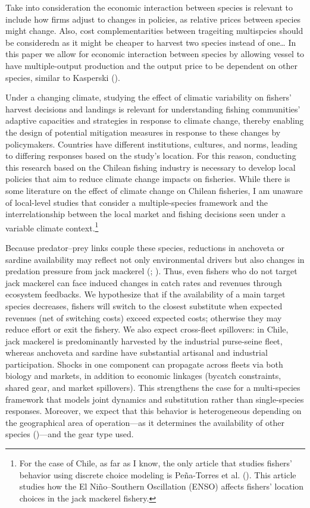 \documentclass[
  11pt,
]{article}
\begin{document}
Take into consideration the economic interaction between species is relevant to include how firms adjust to changes in policies, as relative prices between species might change. Also, cost complementarities between trageiting multispcies should be consideredn as it might be cheaper to harvest two species instead of one\ldots{} In this paper we allow for economic interaction between species by allowing vessel to have multiple-output production and the output price to be dependent on other species, similar to Kasperski ().

Under a changing climate, studying the effect of climatic variability on
fishers' harvest decisions and landings is relevant for understanding
fishing communities' adaptive capacities and strategies in response to
climate change, thereby enabling the design of potential mitigation
measures in response to these changes by policymakers. Countries have
different institutions, cultures, and norms, leading to differing
responses based on the study's location. For this reason, conducting
this research based on the Chilean fishing industry is necessary to
develop local policies that aim to reduce climate change impacts on
fisheries. While there is some literature on the effect of climate
change on Chilean fisheries, I am unaware of local-level studies that
consider a multiple-species framework and the interrelationship between
the local market and fishing decisions seen under a variable climate
context.\footnote{For the case of Chile, as far as I know, the only article that
  studies fishers' behavior using discrete choice modeling is
  Peña-Torres et al. (). This article studies how the El Niño--Southern
  Oscillation (ENSO) affects fishers' location choices in the jack
  mackerel fishery.}

Because predator--prey links couple these species, reductions in
anchoveta or sardine availability may reflect not only environmental
drivers but also changes in predation pressure from jack mackerel
(; ). Thus, even fishers who do not target
jack mackerel can face induced changes in catch rates and revenues
through ecosystem feedbacks. We hypothesize that if the availability of
a main target species decreases, fishers will switch to the closest
substitute when expected revenues (net of switching costs) exceed
expected costs; otherwise they may reduce effort or exit the fishery. We
also expect cross-fleet spillovers: in Chile, jack mackerel is
predominantly harvested by the industrial purse-seine fleet, whereas
anchoveta and sardine have substantial artisanal and industrial
participation. Shocks in one component can propagate across fleets via
both biology and markets, in addition to economic linkages (bycatch
constraints, shared gear, and market spillovers). This strengthens the
case for a multi-species framework that models joint dynamics and
substitution rather than single-species responses. Moreover, we expect
that this behavior is heterogeneous depending on the geographical area
of operation---as it determines the availability of other species
()---and the gear type used.
\end{document}
